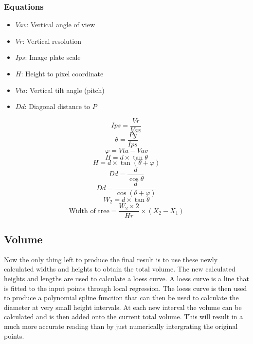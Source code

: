 \subsubsection{Equations}
\begin{itemize}
	\item $Vav$: Vertical angle of view
	\item $Vr$: Vertical resolution
	\item $Ips$: Image plate scale
	\item $H$: Height to pixel coordinate
	\item $Vta$: Vertical tilt angle (pitch)
	\item $Dd$: Diagonal distance to $P$
\end{itemize}

\begin{equation}
	Ips = \frac{Vr}{Vav}
	\label{ips}
\end{equation}
\begin{equation}
	\theta = \frac{Py}{Ips}
	\label{theta}
\end{equation}
\begin{equation}
	\varphi = Vta - Vav
	\label{varphi}
\end{equation}
\begin{equation}
	H = d \times \tan{\theta}
	\label{py1}
\end{equation}
\begin{equation}
	H = d \times \tan{(\theta + \varphi)}
	\label{py2}
\end{equation}
\begin{equation}
	Dd = \frac{d}{\cos{\theta}}
	\label{Dd1}
\end{equation}
\begin{equation}
	Dd = \frac{d}{\cos{(\theta + \varphi)}}
	\label{Dd2}
\end{equation}
\begin{equation}
	W_2 = d \times \tan{\theta}
	\label{w2a}
\end{equation}
\begin{equation}
	\text{Width of tree} = \frac{W_2 \times 2}{Hr} \times (X_2 - X_1)
	\label{widtheq}
\end{equation}
	
\subsection{Volume}
Now the only thing left to produce the final result is to use these newly calculated widths and heights to obtain the total volume. The new calculated heights and lengths are used to calculate a loess curve. A loess curve is a line that is fitted to the input points through local regression. The loess curve is then used to produce a polynomial spline function that can then be used to calculate the diameter at very small height intervals. At each new interval the volume can be calculated and is then added onto the current total volume. This will result in a much more accurate reading than by just numerically intergrating the original points.

